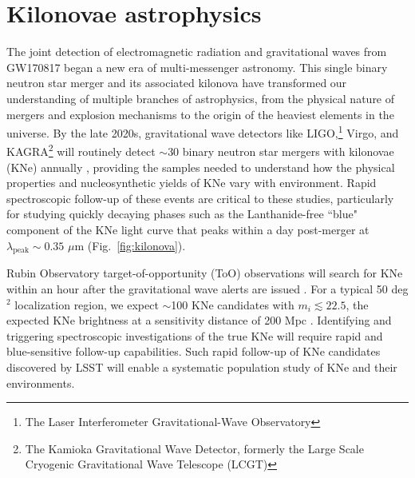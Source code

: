 \documentclass[11pt,a4paper,twoside,onecolumn,openany,final,oldfontcommands]{memoir}
\begin{document}
\section{Kilonovae astrophysics}
\label{sec:kne}

The joint detection of electromagnetic radiation and gravitational waves from GW170817 began a new era of multi-messenger astronomy.  This single binary neutron star merger and its associated kilonova have transformed our understanding of multiple branches of astrophysics, from the physical nature of mergers and explosion mechanisms to the origin of the heaviest elements in the universe.  By the late 2020s, gravitational wave detectors like LIGO,\footnote{The Laser Interferometer Gravitational-Wave Observatory} Virgo, and KAGRA\footnote{The Kamioka Gravitational Wave Detector, formerly the Large Scale Cryogenic Gravitational Wave Telescope (LCGT)} will routinely detect $\sim$30 binary neutron star mergers with kilonovae (KNe) annually \citep{abbott2018prospects}, providing the samples needed to understand how the physical properties and nucleosynthetic yields of KNe vary with environment.  Rapid spectroscopic follow-up of these events are critical to these studies, particularly for studying quickly decaying phases such as the Lanthanide-free ``blue" component of the KNe light curve that peaks within a day post-merger at $\lambda_\mathrm{peak}\sim0.35$ $\mu$m (Fig.~\ref{fig:kilonova}).

Rubin Observatory target-of-opportunity (ToO) observations will search for KNe within an hour after the gravitational wave alerts are issued \citep[assuming the strategy proposed by][]{margutti2018}. For a typical 50 deg$^2$ localization region, we expect $\sim$100 KNe candidates with $m_i\lesssim22.5$, the expected KNe brightness at a sensitivity distance of 200 Mpc \citep{cowperthwaite2017, goldstein2019}. Identifying and triggering spectroscopic investigations of the true KNe will require rapid and blue-sensitive follow-up capabilities. Such rapid follow-up of KNe candidates discovered by LSST will enable a systematic population study of KNe and their environments.

\end{document}
